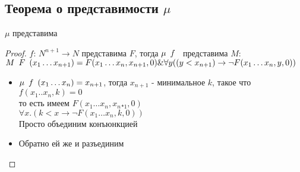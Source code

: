 \subsection{Теорема о представимости \texorpdfstring{$\mu$}{мю}}
\label{sec-11-7}
\begin{theorem}
$\mu$ представима
\end{theorem}
\begin{proof}
$f$: $N^{n+1} \to N $ представима $F$, тогда $\mu \template{f}$ представима $M$:\\
$M\template{F}(x_1 \dots x_{n+1}) = F(x_1 \dots x_n, x_{n+1}, 0) \& \forall y((y < x_{n+1}) \to \lnot F(x_1 \dots x_n, y, 0))$
\begin{itemize}
\item $\mu \template{f}(x_1 \dots x_n) = x_{n+1}$, тогда $x_{n+1}$ - минимальное $k$, такое что $f(x_1..x_n,k) = 0$\\
то есть имеем $F(x_1\dots x_n, x_n₊_1, 0)$\\
$\forall x.(k < x \to \lnot F(x_1 \dots x_n, k, 0))$\\
Просто объединим конъюнкцией
\item Обратно ей же и разъединим
\end{itemize}
\end{proof}